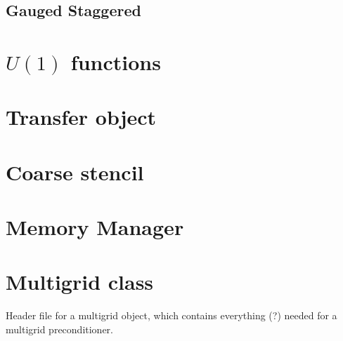 \documentclass[pdftex,letterpaper,10pt]{article}
\begin{document}
\subsection{Gauged Staggered}

\section{$U(1)$ functions}

\section{Transfer object}

\section{Coarse stencil}

\section{Memory Manager}

\section{Multigrid class}


Header file for a multigrid object, which contains everything (?) needed for a multigrid preconditioner.
\end{document}

